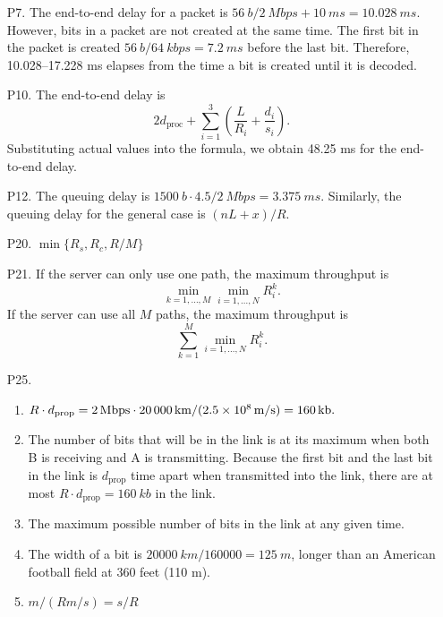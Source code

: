 \documentclass{article}
\begin{document}
\begin{enumerate}
    \item[P7.] The end-to-end delay for a packet is $\SI{56}{b} / \SI{2}{Mbps} + \SI{10}{ms} = \SI{10.028}{ms}$. However, bits in a packet are not created at the same time. The first bit in the packet is created $\SI{56}{b} / \SI{64}{kbps} = \SI{7.2}{ms}$ before the last bit. Therefore, 10.028--17.228 ms elapses from the time a bit is created until it is decoded.

    \item[P10.] The end-to-end delay is
    \[
        2d_\textrm{proc} + \sum_{i = 1}^3 \left(\frac{L}{R_i} + \frac{d_i}{s_i}\right).
    \]
    Substituting actual values into the formula, we obtain 48.25 ms for the end-to-end delay.

    \item[P12.] The queuing delay is $\SI{1500}{b} \cdot 4.5 / \SI{2}{Mbps} = \SI{3.375}{ms}$. Similarly, the queuing delay for the general case is $(nL + x)/R$.
    
    \item[P20.] $\min\{R_s, R_c, R/M\}$
    
    \item[P21.] If the server can only use one path, the maximum throughput is
    \[
        \min_{k = 1, \dots, M} \min_{i = 1, \dots, N} R_i^k.
    \]
    If the server can use all $M$ paths, the maximum throughput is
    \[
        \sum_{k = 1}^M \min_{i = 1, \dots, N} R_i^k.
    \]

    \item[P25.] \begin{enumerate}
        \item $R \cdot d_\textrm{prop} = \SI{2}{Mbps} \cdot \SI{20000}{km} / (\SI{2.5d8}{m/s}) = \SI{160}{kb}.$
        \item The number of bits that will be in the link is at its maximum when both B is receiving and A is transmitting. Because the first bit and the last bit in the link is $d_\textrm{prop}$ time apart when transmitted into the link, there are at most $R \cdot d_\textrm{prop} = \SI{160}{kb}$ in the link.
        \item The maximum possible number of bits in the link at any given time.
        \item The width of a bit is $\SI{20000}{km} / \num{160000} = \SI{125}{m}$, longer than an American football field at 360 feet (110 m).
        \item $m / (Rm/s) = s/R$
    \end{enumerate}


\end{enumerate}
\end{document}

